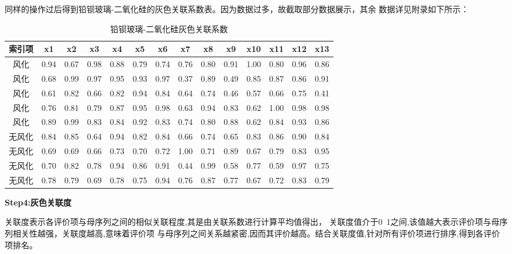 \documentclass[UTF8]{ctexart}
\begin{document}
同样的操作过后得到铅钡玻璃-二氧化硅的灰色关联系数表。因为数据过多，故截取部分数据展示，其余
数据详见附录如下所示：
\begin{table}[H]
    \centering
    \caption{铅钡玻璃-二氧化硅灰色关联系数}
    \begin{tabular}{|c|c|c|c|c|c|c|c|c|c|c|c|c|c|}
        \hline
        索引项 & x1   & x2   & x3   & x4   & x5   & x6   & x7   & x8   & x9   & x10  & x11  & x12  & x13  \\ \hline
        风化   & 0.94 & 0.67 & 0.98 & 0.88 & 0.79 & 0.74 & 0.76 & 0.80 & 0.91 & 1.00 & 0.80 & 0.96 & 0.86 \\ \hline
        风化   & 0.68 & 0.99 & 0.97 & 0.95 & 0.93 & 0.97 & 0.37 & 0.89 & 0.49 & 0.85 & 0.87 & 0.86 & 0.91 \\ \hline
        风化   & 0.61 & 0.82 & 0.66 & 0.82 & 0.94 & 0.84 & 0.64 & 0.74 & 0.46 & 0.57 & 0.66 & 0.75 & 0.41 \\ \hline
        风化   & 0.76 & 0.81 & 0.79 & 0.87 & 0.95 & 0.98 & 0.63 & 0.94 & 0.83 & 0.62 & 1.00 & 0.98 & 0.98 \\ \hline
        风化   & 0.89 & 0.99 & 0.83 & 0.84 & 0.92 & 0.83 & 0.74 & 0.80 & 0.88 & 0.62 & 0.84 & 0.93 & 0.86 \\ \hline
        无风化 & 0.84 & 0.85 & 0.64 & 0.94 & 0.82 & 0.84 & 0.66 & 0.74 & 0.65 & 0.83 & 0.86 & 0.90 & 0.84 \\ \hline
        无风化 & 0.69 & 0.69 & 0.66 & 0.73 & 0.70 & 0.72 & 1.00 & 0.71 & 0.89 & 0.67 & 0.79 & 0.83 & 0.95 \\ \hline
        无风化 & 0.70 & 0.82 & 0.78 & 0.94 & 0.86 & 0.91 & 0.44 & 0.99 & 0.58 & 0.77 & 0.59 & 0.97 & 0.75 \\ \hline
        无风化 & 0.78 & 0.79 & 0.69 & 0.78 & 0.75 & 0.94 & 0.76 & 0.87 & 0.77 & 0.67 & 0.72 & 0.83 & 0.79 \\ \hline
    \end{tabular}
\end{table}

\textbf{Step4:灰色关联度}

关联度表示各评价项与母序列之间的相似关联程度,其是由关联系数进行计算平均值得出，
关联度值介于0~1之间,该值越大表示评价项与母序列相关性越强，关联度越高,意味着评价项
与母序列之间关系越紧密,因而其评价越高。结合关联度值,针对所有评价项进行排序,得到各评价项排名。
\end{document}
